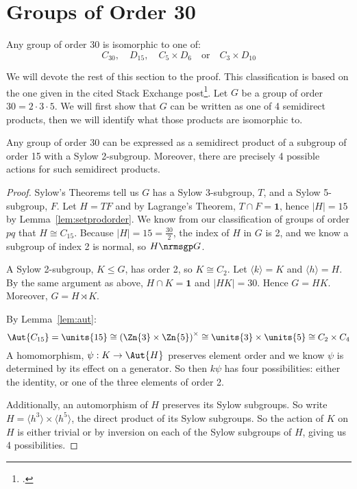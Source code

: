 \section{Groups of Order 30}
\begin{theorem}\label{thm:30}
    Any group of order 30 is isomorphic to one of:
    \[
        C_{30}, \quad%
        D_{15}, \quad%
        C_5 \times D_6 \quad \text{or} \quad%
        C_3 \times D_{10}
    \]
\end{theorem}

We will devote the rest of this section to the proof.
This classification is based on the one given in the cited Stack Exchange post\footcite{order30}.
Let \(G\) be a group of order \(30 = 2 \cdot 3 \cdot 5\).
We will first show that \(G\) can be written as one of 4 semidirect products, then we will identify what those products
are isomorphic to.

\begin{lemma}\label{lem:order_30_actions}
    Any group of order 30 can be expressed as a semidirect product of a subgroup of order 15 with a Sylow 2-subgroup.
    Moreover, there are precisely 4 possible actions for such semidirect products.
\end{lemma}

\begin{proof}
    Sylow's Theorems tell us \(G\) has a Sylow 3-subgroup, \(T\), and a Sylow 5-subgroup, \(F\).
    Let \(H = TF\) and by Lagrange's Theorem, \(T \cap F = \bm{1}\), hence \(|H| = 15\) by Lemma~\ref{lem:setprodorder}.
    We know from our classification of groups of order \(pq\) that \(H \cong C_{15}\).
    Because \(|H| = 15 = \frac{30}{2}\), the index of \(H\) in \(G\) is 2, and we know a subgroup of index 2 is normal,
    so \(H \nrmsgp G\).

    A Sylow 2-subgroup, \(K \leqslant G\), has order 2, so \(K \cong C_2\).
    Let \(\langle k \rangle = K\) and \(\langle h \rangle = H\).
    By the same argument as above, \(H \cap K = \bm{1}\) and \(|HK| = 30\).
    Hence \(G = HK\).
    Moreover, \(G = H \rtimes K\).

    By Lemma~\ref{lem:aut}:
    \[\Aut{C_{15}} = \units{15} \cong {(\Zn{3} \times \Zn{5})}^\times \cong \units{3} \times \units{5} \cong C_2 \times C_4\]
    A homomorphism, \(\psi:K \to \Aut{H}\) preserves element order and we know \(\psi\) is determined by its
    effect on a generator.
    So then \(k\psi\) has four possibilities: either the identity, or one of the three elements
    of order 2.

    Additionally, an automorphism of \(H\) preserves its Sylow subgroups.
    So write \(H = \langle h^3 \rangle \times \langle h^5 \rangle\), the direct product of its Sylow subgroups.
    So the action of \(K\) on \(H\) is either trivial or by inversion on each of the Sylow subgroups of \(H\), giving us 4
    possibilities.
\end{proof}

